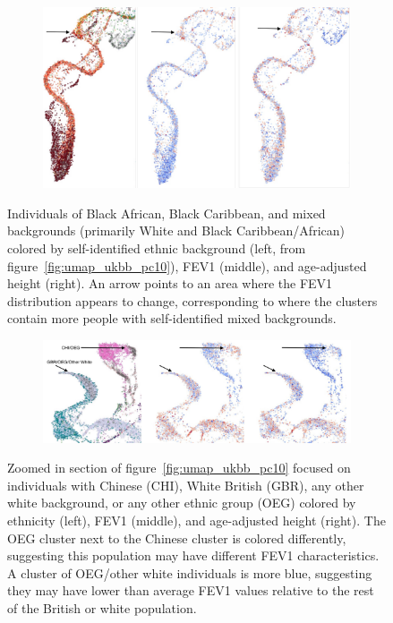 \documentclass[12pt]{pnas-new}
\begin{document}
\begin{figure}
    \centering
    \begin{subfigure}{\textwidth}
    \includegraphics[width=\textwidth]{images/montage_fev1_height_afr_permuted.pdf}
    \end{subfigure}
    \caption{Individuals of Black African, Black Caribbean, and mixed backgrounds (primarily White and Black Caribbean/African) colored by self-identified ethnic background (left, from figure~\ref{fig:umap_ukbb_pc10}), FEV1 (middle), and age-adjusted height (right). An arrow points to an area where the FEV1 distribution appears to change, corresponding to where the clusters contain more people with self-identified mixed backgrounds.}
    \label{fig:supp_comparison_fev_afr}
\end{figure}

\begin{figure}
    \centering
    \begin{subfigure}{\textwidth}
    \includegraphics[width=\textwidth]{images/montage_fev1_height_chi_eur_permuted.pdf}
    \end{subfigure}
    \caption{Zoomed in section of figure~\ref{fig:umap_ukbb_pc10} focused on individuals with Chinese (CHI), White British (GBR), any other white background, or any other ethnic group (OEG) colored by ethnicity (left), FEV1 (middle), and age-adjusted height (right). The OEG cluster next to the Chinese cluster is colored differently, suggesting this population may have different FEV1 characteristics. A cluster of OEG/other white individuals is more blue, suggesting they may have lower than average FEV1 values relative to the rest of the British or white population.}
    \label{fig:supp_comparison_fev_chi_eur}
\end{figure}
\end{document}
